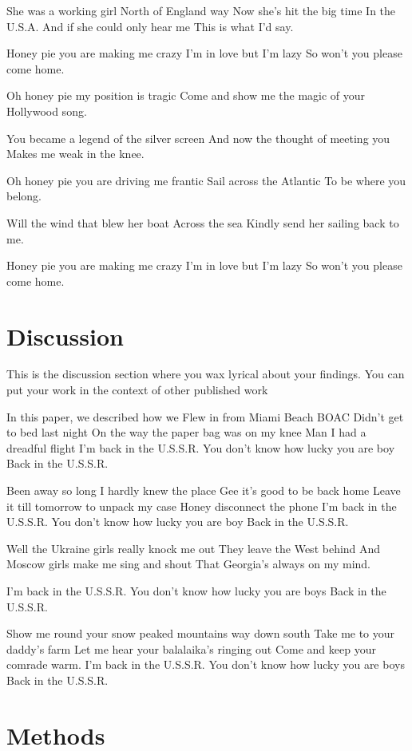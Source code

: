 \documentclass[vruler,JCS]{COB}
\begin{document}
She was a working girl
North of England way
Now she's hit the big time
In the U.S.A.
And if she could only hear me
This is what I'd say.

Honey pie you are making me crazy 
I'm in love but I'm lazy
So won't you please come home.

Oh honey pie my position is tragic
Come and show me the magic
of your Hollywood song.

You became a legend of the silver screen
And now the thought of meeting you
Makes me weak in the knee.

Oh honey pie you are driving me frantic
Sail across the Atlantic
To be where you belong.

Will the wind that blew her boat 
Across the sea
Kindly send her sailing back to me.

Honey pie you are making me crazy
I'm in love but I'm lazy
So won't you please come home.

\section{Discussion}\label{s:discussion}

This is the discussion section where you wax lyrical about your findings.
You can put your work in the context of other published work \citep{brenner_ug:_1967}

In this paper, we described how we Flew in from Miami Beach BOAC
Didn't get to bed last night
On the way the paper bag was on my knee
Man I had a dreadful flight
I’m back in the U.S.S.R.
You don't know how lucky you are boy
Back in the U.S.S.R.

Been away so long I hardly knew the place
Gee it's good to be back home
Leave it till tomorrow to unpack my case
Honey disconnect the phone
I'm back in the U.S.S.R.
You don't know how lucky you are boy
Back in the U.S.S.R.

Well the Ukraine girls really knock me out
They leave the West behind
And Moscow girls make me sing and shout
That Georgia's always on my mind.

I'm back in the U.S.S.R.
You don't know how lucky you are boys
Back in the U.S.S.R.

Show me round your snow peaked mountains way down south
Take me to your daddy's farm
Let me hear your balalaika’s ringing out
Come and keep your comrade warm.
I'm back in the U.S.S.R. 
You don’t know how lucky you are boys
Back in the U.S.S.R.

\section{Methods}\label{s:methods}
\end{document}
